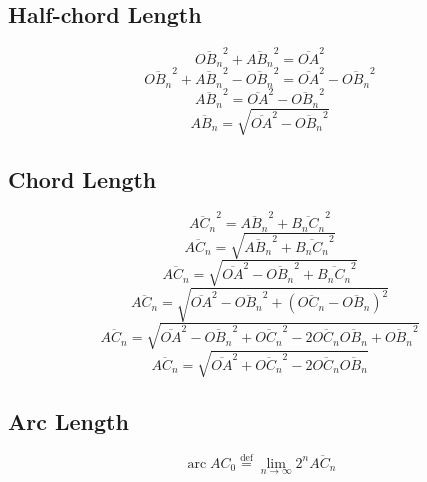 \documentclass[a4paper,12pt]{report}
\DeclareMathOperator{\arc}{arc}
\begin{document}
\subsection{Half-chord Length}
\begin{equation}
\overline{OB_n}^2 + \overline{AB_n}^2 = \overline{OA}^2
\end{equation}
\begin{equation}
\overline{OB_n}^2 + \overline{AB_n}^2 - \overline{OB_n}^2 = \overline{OA}^2 - \overline{OB_n}^2
\end{equation}
\begin{equation}
\overline{AB_n}^2 = \overline{OA}^2 - \overline{OB_n}^2
\end{equation}
\begin{equation}
\overline{AB_n} = \sqrt{\overline{OA}^2 - \overline{OB_n}^2}
\end{equation}
\subsection{Chord Length}
\begin{equation}
\overline{AC_n}^2 = \overline{AB_n}^2 + \overline{B_nC_n}^2
\end{equation}
\begin{equation}
\overline{AC_n} = \sqrt{\overline{AB_n}^2 + \overline{B_nC_n}^2}
\end{equation}
\begin{equation}
\overline{AC_n} = \sqrt{\overline{OA}^2 - \overline{OB_n}^2 + \overline{B_nC_n}^2}
\end{equation}
\begin{equation}
\overline{AC_n} = \sqrt{\overline{OA}^2 - \overline{OB_n}^2 + \left(\overline{OC_n} - \overline{OB_n}\right)^2}
\end{equation}
\begin{equation}
\overline{AC_n} = \sqrt{\overline{OA}^2 - \overline{OB_n}^2 + \overline{OC_n}^2 - 2 \overline{OC_n} \overline{OB_n} + \overline{OB_n}^2}
\end{equation}
\begin{equation}
\overline{AC_n} = \sqrt{\overline{OA}^2 + \overline{OC_n}^2 - 2 \overline{OC_n} \overline{OB_n}}
\end{equation}
\subsection{Arc Length}
\begin{equation}
\arc AC_0 \stackrel{\text{def}}{=} \lim \limits_{n \to \infty} 2^n \overline{AC_n}
\end{equation}
\end{document}
